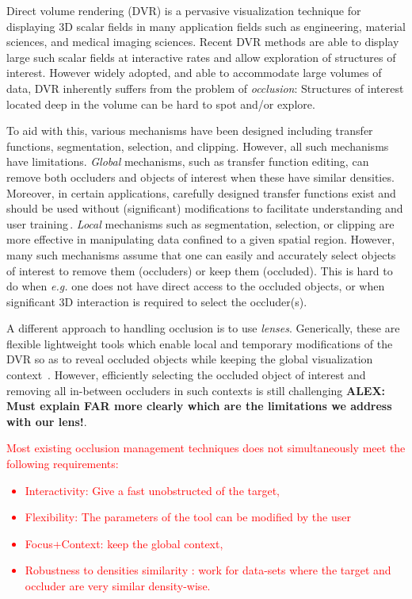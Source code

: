 Direct volume rendering (DVR) is a pervasive visualization technique for displaying 3D scalar fields in many application fields such as engineering, material sciences, and medical imaging sciences. Recent DVR methods are able to display large such scalar fields at interactive rates and allow exploration of structures of interest. However widely adopted, and able to accommodate large volumes of data, DVR inherently suffers from the problem of \emph{occlusion}: Structures of interest located deep in the volume can be hard to spot and/or explore.

To aid with this, various mechanisms have been designed including transfer functions, segmentation, selection, and clipping. However, all such mechanisms have limitations.  \emph{Global} mechanisms, such as transfer function editing, can remove both occluders and objects of interest when these have similar densities. Moreover, in certain applications, carefully designed transfer functions exist and should be used without (significant) modifications to facilitate understanding and user training\,\cite{xxx}. \emph{Local} mechanisms such as segmentation, selection, or clipping are more effective in manipulating data confined to a given spatial region. However, many such mechanisms assume that one can easily and accurately select objects of interest to remove them (occluders) or keep them (occluded). This is hard to do when \emph{e.g.} one does not have direct access to the occluded objects, or when significant 3D interaction is required to select the occluder(s).

A different approach to handling occlusion is to use \emph{lenses}. Generically, these are flexible lightweight tools which enable local and temporary modifications of the DVR so as to reveal occluded objects while keeping the global visualization context~\cite{595268,CGF:CGF12871,xxx}. However, efficiently selecting the occluded object of interest and removing all in-between occluders in such contexts is still challenging \textbf{ALEX: Must explain FAR more clearly which are the limitations we address with our lens!}. \textcolor{red}{
Most existing occlusion management techniques does not simultaneously meet the following requirements:  
\begin{itemize}
\item Interactivity: Give a fast unobstructed of the target,
\item Flexibility: The parameters of the tool can be modified by the user
\item Focus+Context: keep the global context,
\item Robustness to densities similarity : work for data-sets where the target and occluder are very similar density-wise.
\end{itemize}
}

